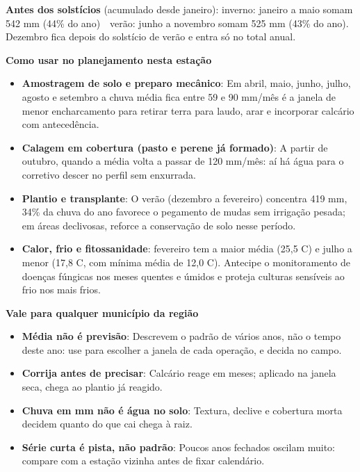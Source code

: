 \documentclass[10pt,a4paper]{article}
\begin{document}
\vspace{1pt}
{\footnotesize\textbf{Antes dos solstícios} (acumulado desde janeiro):
inverno: janeiro a maio somam 542 mm (44\% do ano) \,\textbullet\, verão: junho a novembro somam 525 mm (43\% do ano). Dezembro fica depois do solstício de verão e entra só no total
anual.}

\vspace{2pt}
{\bfseries\small Como usar no planejamento nesta estação}

\footnotesize\begin{itemize}\setlength{\itemsep}{0.5pt}
  \item \textbf{Amostragem de solo e preparo mecânico}: Em abril, maio, junho, julho, agosto e setembro a chuva média fica entre 59 e 90 mm/mês \textemdash{} é a janela de menor encharcamento para retirar terra para laudo, arar e incorporar calcário com antecedência.
  \item \textbf{Calagem em cobertura (pasto e perene já formado)}: A partir de outubro, quando a média volta a passar de 120 mm/mês: aí há água para o corretivo descer no perfil sem enxurrada.
  \item \textbf{Plantio e transplante}: O verão (dezembro a fevereiro) concentra 419 mm, 34\% da chuva do ano \textemdash{} favorece o pegamento de mudas sem irrigação pesada; em áreas declivosas, reforce a conservação de solo nesse período.
  \item \textbf{Calor, frio e fitossanidade}: fevereiro tem a maior média (25,5 \textdegree{}C) e julho a menor (17,8 \textdegree{}C, com mínima média de 12,0 \textdegree{}C). Antecipe o monitoramento de doenças fúngicas nos meses quentes e úmidos e proteja culturas sensíveis ao frio nos mais frios.
\end{itemize}

\vspace{1pt}
{\bfseries\small Vale para qualquer município da região}

\scriptsize\begin{itemize}\setlength{\itemsep}{0.5pt}
  \item \textbf{Média não é previsão}: Descrevem o padrão de vários anos, não o tempo deste ano: use para escolher a janela de cada operação, e decida no campo.
  \item \textbf{Corrija antes de precisar}: Calcário reage em meses; aplicado na janela seca, chega ao plantio já reagido.
  \item \textbf{Chuva em mm não é água no solo}: Textura, declive e cobertura morta decidem quanto do que cai chega à raiz.
  \item \textbf{Série curta é pista, não padrão}: Poucos anos fechados oscilam muito: compare com a estação vizinha antes de fixar calendário.
\end{itemize}
\end{document}
